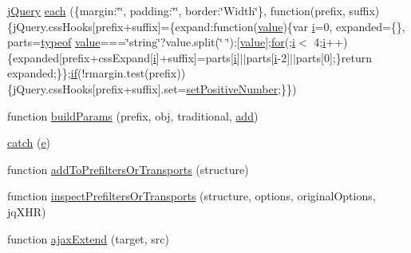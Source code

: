 \begin{DoxyCompactItemize}
\hyperlink{_site_bundle_2_resources_2public_2js_2_specific_functions_8js_ada154f66b5b2b806f5e239376e925644}{j\+Query} \hyperlink{jquery-1_89_81_8js_a4d613a6d16c025ab901ff536b58f9ecd}{each} (\{margin\+:\char`\"{}\char`\"{}, padding\+:\char`\"{}\char`\"{}, border\+:\char`\"{}Width\char`\"{}\}, function(prefix, suffix)\{j\+Query.\+css\+Hooks\mbox{[}prefix+suffix\mbox{]}=\{expand\+:function(\hyperlink{fullpage_2plugin_8min_8js_ac56c57897e10f699d124e0103921aa20}{value})\{var \hyperlink{validate_8js_a5e25b1d1bed9ab5f3174b76d6a722180}{i}=0, expanded=\{\}, parts=\hyperlink{extras_2_scroller_2media_2docs_2media_2js_2sh_brush_j_script_8js_a93a9266f92d6d68644e7aa63da3caa11}{typeof} \hyperlink{fullpage_2plugin_8min_8js_ac56c57897e10f699d124e0103921aa20}{value}===\char`\"{}string\char`\"{}?value.\+split(\char`\"{} \char`\"{})\+:\mbox{[}\hyperlink{fullpage_2plugin_8min_8js_ac56c57897e10f699d124e0103921aa20}{value}\mbox{]};\hyperlink{tinymce_8jquery_8dev_8js_a4675a875b20881bc5f7011f49fbd4da7}{for}(;\hyperlink{validate_8js_a5e25b1d1bed9ab5f3174b76d6a722180}{i}$<$ 4;\hyperlink{validate_8js_a5e25b1d1bed9ab5f3174b76d6a722180}{i}++)\{expanded\mbox{[}prefix+css\+Expand\mbox{[}\hyperlink{validate_8js_a5e25b1d1bed9ab5f3174b76d6a722180}{i}\mbox{]}+suffix\mbox{]}=parts\mbox{[}\hyperlink{validate_8js_a5e25b1d1bed9ab5f3174b76d6a722180}{i}\mbox{]}$\vert$$\vert$parts\mbox{[}\hyperlink{validate_8js_a5e25b1d1bed9ab5f3174b76d6a722180}{i}-\/2\mbox{]}$\vert$$\vert$parts\mbox{[}0\mbox{]};\}return expanded;\}\};\hyperlink{fullpage_2plugin_8js_a8b98017e64ef036adb9ae327ff94abe1}{if}(!rmargin.\+test(prefix))\{j\+Query.\+css\+Hooks\mbox{[}prefix+suffix\mbox{]}.set=\hyperlink{jquery-1_89_81_8js_a049182834e8b4b2d7485cd919ed272d7}{set\+Positive\+Number};\}\})
\item 
function \hyperlink{jquery-1_89_81_8js_a3c4f3b337daa2444fa73ee856be5f9d8}{build\+Params} (prefix, obj, traditional, \hyperlink{theme_8min_8js_a1833965973c7833716346fa64230bb38}{add})
\item 
\hyperlink{jquery-1_89_81_8js_a5bf45fc51bc0426586792b5f9cb95431}{catch} (\hyperlink{validate_8js_acafd152b1d81d2bd0f5775007db75586}{e})
\item 
function \hyperlink{jquery-1_89_81_8js_ae8bffbac8c6b2208e0ca37b475ec0b70}{add\+To\+Prefilters\+Or\+Transports} (structure)
\item 
function \hyperlink{jquery-1_89_81_8js_ac96b244aea80657fe2d6e3d2c1e8b622}{inspect\+Prefilters\+Or\+Transports} (structure, options, original\+Options, jq\+X\+H\+R)
\item 
function \hyperlink{jquery-1_89_81_8js_a113ade43cfd5328ebd5ccc84f45fe4de}{ajax\+Extend} (target, src)

\end{DoxyCompactItemize}
